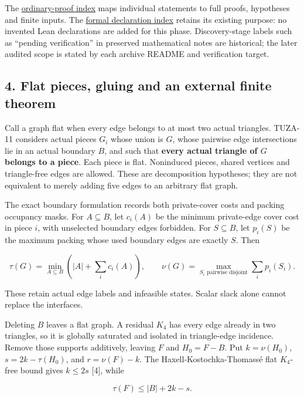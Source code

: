 \documentclass[11pt,a4paper]{article}
\begin{document}
The \href{https://github.com/pappa211/ai-math-experiments/blob/main/ORDINARY_PROOF_INDEX.md}{ordinary-proof index} maps individual statements to full proofs, hypotheses and finite inputs. The \href{https://github.com/pappa211/ai-math-experiments/blob/main/DECLARATION_INDEX.md}{formal declaration index} retains its existing purpose: no invented Lean declarations are added for this phase. Discovery-stage labels such as ``pending verification'' in preserved mathematical notes are historical; the later audited scope is stated by each archive README and verification target.

\subsection{4. Flat pieces, gluing and an external finite theorem}\label{flat-pieces-gluing-and-an-external-finite-theorem}

Call a graph flat when every edge belongs to at most two actual triangles. TUZA-11 considers actual pieces \(G_i\) whose union is \(G\), whose pairwise edge intersections lie in an actual boundary \(B\), and such that \textbf{every actual triangle of \(G\) belongs to a piece}. Each piece is flat. Noninduced pieces, shared vertices and triangle-free edges are allowed. These are decomposition hypotheses; they are not equivalent to merely adding five edges to an arbitrary flat graph.

The exact boundary formulation records both private-cover costs and packing occupancy masks. For \(A\subseteq B\), let \(c_i(A)\) be the minimum private-edge cover cost in piece \(i\), with unselected boundary edges forbidden. For \(S\subseteq B\), let \(p_i(S)\) be the maximum packing whose used boundary edges are exactly \(S\). Then

\[\tau(G)=\min_{A\subseteq B}\left(|A|+\sum_i c_i(A)\right),
\qquad
\nu(G)=\max_{S_i\text{ pairwise disjoint}}\sum_i p_i(S_i).\]

These retain actual edge labels and infeasible states. Scalar slack alone cannot replace the interfaces.

Deleting \(B\) leaves a flat graph. A residual \(K_4\) has every edge already in two triangles, so it is globally saturated and isolated in triangle-edge incidence. Remove those supports additively, leaving \(F\) and \(H_0=F-B\). Put \(k=\nu(H_0)\), \(s=2k-\tau(H_0)\), and \(r=\nu(F)-k\). The Haxell-Kostochka-Thomassé flat \(K_4\)-free bound gives \(k\le2s\) {[}4{]}, while

\[\tau(F)\le |B|+2k-s.\]
\end{document}
